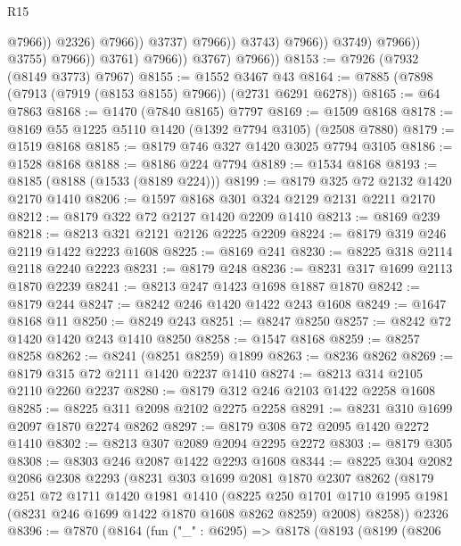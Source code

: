 \begin{lexlean}{R15}
\begin{coremodule}
                                                  @7966))
                                              @2326)
                                            @7966))
                                        @3737)
                                      @7966))
                                  @3743)
                                @7966))
                            @3749)
                          @7966))
                      @3755)
                    @7966))
                @3761)
              @7966))
          @3767)
        @7966))
@8153 := @7926 (@7932 (@8149 @3773) @7967)
@8155 := @1552 @3467 @43
@8164 := @7885 (@7898 (@7913 (@7919 (@8153 @8155) @7966)) (@2731 @6291 @6278))
@8165 := @64 @7863
@8168 := @1470 (@7840 @8165) @7797
@8169 := @1509 @8168
@8178 := @8169 @55 @1225 @5110 @1420 (@1392 @7794 @3105) (@2508 @7880)
@8179 := @1519 @8168
@8185 := @8179 @746 @327 @1420 @3025 @7794 @3105
@8186 := @1528 @8168
@8188 := @8186 @224 @7794
@8189 := @1534 @8168
@8193 := @8185 (@8188 (@1533 (@8189 @224)))
@8199 := @8179 @325 @72 @2132 @1420 @2170 @1410
@8206 := @1597 @8168 @301 @324 @2129 @2131 @2211 @2170
@8212 := @8179 @322 @72 @2127 @1420 @2209 @1410
@8213 := @8169 @239
@8218 := @8213 @321 @2121 @2126 @2225 @2209
@8224 := @8179 @319 @246 @2119 @1422 @2223 @1608
@8225 := @8169 @241
@8230 := @8225 @318 @2114 @2118 @2240 @2223
@8231 := @8179 @248
@8236 := @8231 @317 @1699 @2113 @1870 @2239
@8241 := @8213 @247 @1423 @1698 @1887 @1870
@8242 := @8179 @244
@8247 := @8242 @246 @1420 @1422 @243 @1608
@8249 := @1647 @8168 @11
@8250 := @8249 @243
@8251 := @8247 @8250
@8257 := @8242 @72 @1420 @1420 @243 @1410 @8250
@8258 := @1547 @8168
@8259 := @8257 @8258
@8262 := @8241 (@8251 @8259) @1899
@8263 := @8236 @8262
@8269 := @8179 @315 @72 @2111 @1420 @2237 @1410
@8274 := @8213 @314 @2105 @2110 @2260 @2237
@8280 := @8179 @312 @246 @2103 @1422 @2258 @1608
@8285 := @8225 @311 @2098 @2102 @2275 @2258
@8291 := @8231 @310 @1699 @2097 @1870 @2274 @8262
@8297 := @8179 @308 @72 @2095 @1420 @2272 @1410
@8302 := @8213 @307 @2089 @2094 @2295 @2272
@8303 := @8179 @305
@8308 := @8303 @246 @2087 @1422 @2293 @1608
@8344 := @8225
    @304
    @2082
    @2086
    @2308
    @2293
    (@8231
      @303
      @1699
      @2081
      @1870
      @2307
      @8262
      (@8179
        @251
        @72
        @1711
        @1420
        @1981
        @1410
        (@8225 @250 @1701 @1710 @1995 @1981 (@8231 @246 @1699 @1422 @1870 @1608 @8262 @8259) @2008)
        @8258))
    @2326
@8396 := @7870
    (@8164
      (fun ("_" : @6295) =>
      @8178
        (@8193
          (@8199
            (@8206

\end{coremodule}
\end{lexlean}
